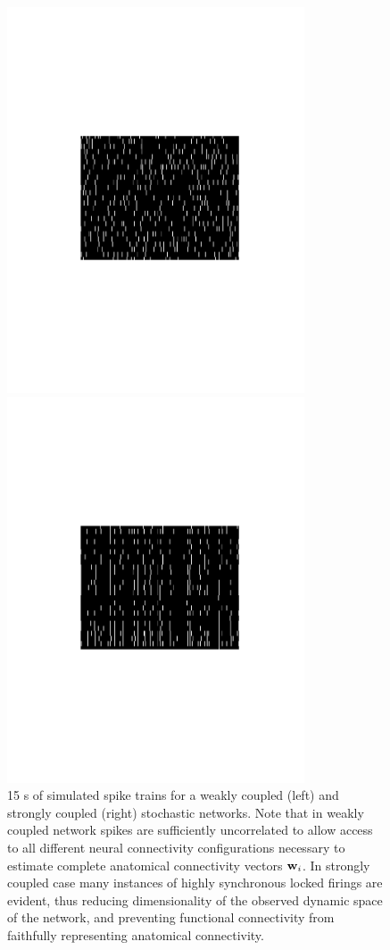 \begin{figure}
\centering
\begin{minipage}[c]{0.45\hsize}
\includegraphics[width=250pt]{../figs/Figure7b_raster_weak}
\end{minipage}
\begin{minipage}[c]{0.45\hsize}
\includegraphics[width=250pt]{../figs/Figure7a_raster_strong}
\end{minipage}
\caption{15 s of simulated spike trains for a weakly coupled (left)
and strongly coupled (right) stochastic networks. Note that in weakly coupled network spikes are sufficiently uncorrelated to allow access to all different neural connectivity configurations necessary to estimate complete anatomical connectivity vectors ${\bf w}_i$. In strongly coupled case many instances of highly synchronous locked firings are evident, thus reducing dimensionality of the observed dynamic space of the network, and preventing functional connectivity from faithfully representing anatomical connectivity.}
\label{fig:rasters}
\end{figure}


